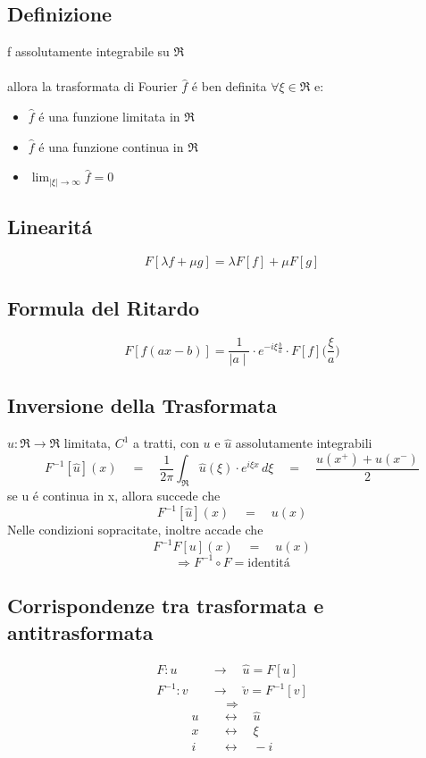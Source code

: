 \documentclass[a4paper,10pt,italian]{article}
\begin{document}
\subsection{Definizione}
f assolutamente integrabile su $\Re$ \\ \\
allora la trasformata di Fourier $\hat{f}$ \'e ben definita $\forall \xi \in \Re$ e: 
\begin{itemize}
\item $\hat{f}$ \'e una funzione limitata in $\Re$
\item $\hat{f}$ \'e una funzione continua in $\Re$
\item $	\lim_{\mid \xi \mid \rightarrow \infty} \hat{f} = 0$
\end{itemize}

\subsection{Linearit\'a}
$$ F[\lambda f + \mu g] = \lambda F[f] + \mu F[g] $$

\subsection{Formula del Ritardo}
$$ F[f(ax-b)] = \frac{1}{\mid a \mid} \cdot e^{-i \xi \frac{b}{a}} \cdot F[f] \Bigr( \frac{\xi}{a} \Bigr)$$

\subsection{Inversione della Trasformata}
$u:\Re \rightarrow \Re$ limitata, $C^1$ a tratti, con $u$ e $\hat{u}$ assolutamente integrabili
$$ F^{-1}[\hat{u}](x) \quad = \quad \frac{1}{2 \pi} \int_{\Re} \hat{u}(\xi)\cdot e^{i\xi x}\,d\xi \quad =\quad \frac{u(x^+)+u(x^-)}{2} $$
se u \'e continua in x, allora succede che
$$ F^{-1}[\hat{u}](x) \quad = \quad u(x)$$
Nelle condizioni sopracitate, inoltre accade che
$$ F^{-1}F[u](x) \quad = \quad u(x) $$
$$ \Rightarrow F^{-1} \circ F = \mbox{identit\'a} $$

\subsection{Corrispondenze tra trasformata e antitrasformata}
\begin{align*}
F:u \quad &\rightarrow \quad \hat{u}=F[u] \\
F^{-1}:v \quad &\rightarrow \quad \check{v}=F^{-1}[v] 
\end{align*}
$$\Longrightarrow$$
\begin{align*}
u \quad &\leftrightarrow \quad \hat{u} \\
x \quad &\leftrightarrow \quad \xi \\
i \quad &\leftrightarrow \quad -i \\
\end{align*}
\end{document}
